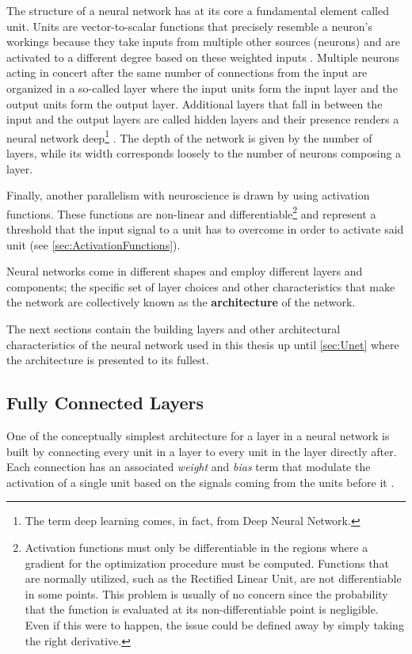 The structure of a neural network has at its core a fundamental element called unit. Units are vector-to-scalar functions that precisely resemble a neuron's workings because they take inputs from multiple other sources (neurons) and are activated to a different degree based on these weighted inputs \citep{Goodfellow2016}. Multiple neurons acting in concert after the same number of connections from the input are organized in a so-called layer where the input units form the input layer and the output units form the output layer. Additional layers that fall in between the input and the output layers are called hidden layers and their presence renders a neural network deep\footnote{The term deep learning comes, in fact, from Deep Neural Network.} \citep{Goodfellow2016}. The depth of the network is given by the number of layers, while its width corresponds loosely to the number of neurons composing a layer. 

Finally, another parallelism with neuroscience is drawn by using activation functions. These functions are non-linear and differentiable\footnote{Activation functions must only be differentiable in the regions where a gradient for the optimization procedure must be computed. Functions that are normally utilized, such as the Rectified Linear Unit, are not differentiable in some points. This problem is usually of no concern since the probability that the function is evaluated at its non-differentiable point is negligible. Even if this were to happen, the issue could be defined away by simply taking the right derivative.} and represent a threshold that the input signal to a unit has to overcome in order to activate said unit (see \cref{sec:ActivationFunctions}).

Neural networks come in different shapes and employ different layers and components; the specific set of layer choices and other characteristics that make the network are collectively known as the \textbf{architecture} of the network.

The next sections contain the building layers and other architectural characteristics of the neural network used in this thesis up until \cref{sec:Unet} where the architecture is presented to its fullest.

\subsection{Fully Connected Layers}\label{sec:FullyConnectedLayers}
One of the conceptually simplest architecture for a layer in a neural network is built by connecting every unit in a layer to every unit in the layer directly after. Each connection has an associated \textit{weight} and \textit{bias} term that modulate the activation of a single unit based on the signals coming from the units before it \citep{Bishop2006PatternLearning}.


